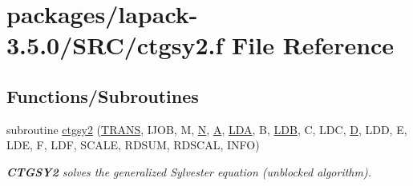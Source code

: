 \hypertarget{ctgsy2_8f}{}\section{packages/lapack-\/3.5.0/\+S\+R\+C/ctgsy2.f File Reference}
\label{ctgsy2_8f}
\subsection*{Functions/\+Subroutines}
\begin{DoxyCompactItemize}
\item 
subroutine \hyperlink{group__complexSYauxiliary_ga82a880920a428b8ac1203547b0e74d6b}{ctgsy2} (\hyperlink{superlu__enum__consts_8h_a0c4e17b2d5cea33f9991ccc6a6678d62a1f61e3015bfe0f0c2c3fda4c5a0cdf58}{T\+R\+A\+N\+S}, I\+J\+O\+B, M, \hyperlink{polmisc_8c_a0240ac851181b84ac374872dc5434ee4}{N}, \hyperlink{classA}{A}, \hyperlink{example__user_8c_ae946da542ce0db94dced19b2ecefd1aa}{L\+D\+A}, B, \hyperlink{example__user_8c_a50e90a7104df172b5a89a06c47fcca04}{L\+D\+B}, C, L\+D\+C, \hyperlink{odrpack_8h_a7dae6ea403d00f3687f24a874e67d139}{D}, L\+D\+D, E, L\+D\+E, F, L\+D\+F, S\+C\+A\+L\+E, R\+D\+S\+U\+M, R\+D\+S\+C\+A\+L, I\+N\+F\+O)
\begin{DoxyCompactList}\small\item\em {\bfseries C\+T\+G\+S\+Y2} solves the generalized Sylvester equation (unblocked algorithm). \end{DoxyCompactList}\end{DoxyCompactItemize}
